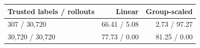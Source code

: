 \begin{tabular}{lrr}
\toprule
Trusted labels / rollouts & Linear & Group-scaled \\
\midrule
307 / 30,720 & 66.41 / 5.08 & 2.73 / 97.27 \\
30,720 / 30,720 & 77.73 / 0.00 & 81.25 / 0.00 \\
\bottomrule
\end{tabular}
